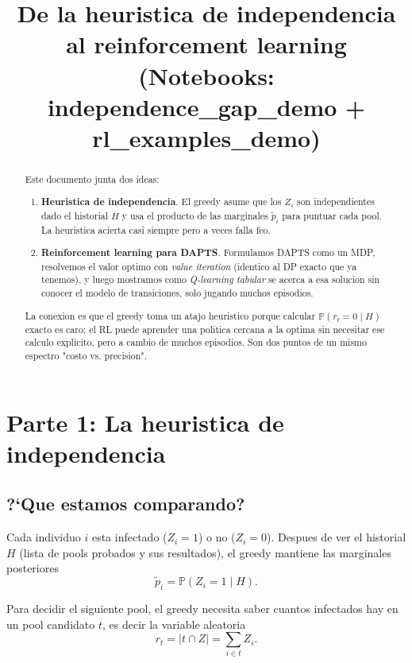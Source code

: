 \documentclass[11pt]{article}
\title{De la heuristica de independencia al reinforcement learning\\
\large (Notebooks: independence\_gap\_demo + rl\_examples\_demo)}
\author{}
\date{}
\begin{document}
\maketitle

\begin{abstract}
Este documento junta dos ideas:

\begin{enumerate}
  \item \textbf{Heuristica de independencia}. El greedy asume que los
    $Z_i$ son independientes dado el historial $H$ y usa el producto
    de las marginales $\tilde p_i$ para puntuar cada pool. La
    heuristica acierta casi siempre pero a veces falla feo.
  \item \textbf{Reinforcement learning para DAPTS}. Formulamos DAPTS
    como un MDP, resolvemos el valor optimo con \emph{value iteration}
    (identico al DP exacto que ya tenemos), y luego mostramos como
    \emph{Q-learning tabular} se acerca a esa solucion sin conocer el
    modelo de transiciones, solo jugando muchos episodios.
\end{enumerate}

La conexion es que el greedy toma un atajo heuristico porque calcular
$\mathbb{P}(r_t = 0 \mid H)$ exacto es caro; el RL puede aprender una
politica cercana a la optima sin necesitar ese calculo explicito, pero
a cambio de muchos episodios. Son dos puntos de un mismo espectro
"costo vs. precision".
\end{abstract}

\section{Parte 1: La heuristica de independencia}

\subsection{?`Que estamos comparando?}

Cada individuo $i$ esta infectado ($Z_i = 1$) o no ($Z_i = 0$). Despues
de ver el historial $H$ (lista de pools probados y sus resultados),
el greedy mantiene las marginales posteriores
\[
\tilde p_i = \mathbb{P}(Z_i = 1 \mid H).
\]

Para decidir el siguiente pool, el greedy necesita saber cuantos
infectados hay en un pool candidato $t$, es decir la variable aleatoria
\[
r_t = \lvert t \cap Z \rvert = \sum_{i \in t} Z_i.
\]
\end{document}
